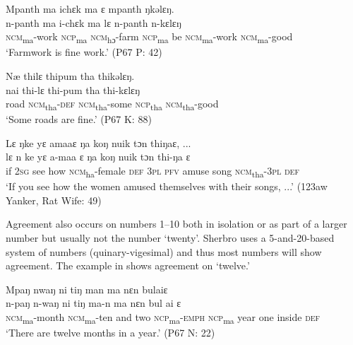 \ex \label{ex:136b} Mpanth ma ichɛk ma ɛ mpanth ŋkəlɛŋ.\\
    \gll n-panth      ma    i-chɛk      ma    lɛ    n-panth      n-kɛlɛŋ\\
    \textsc{ncm}\textsubscript{ma}\textsc{{}-}work  \textsc{ncp}\textsubscript{ma}    \textsc{ncm}\textsubscript{hɔ}\textsc{{}-}farm    \textsc{ncp}\textsubscript{ma}    be    \textsc{ncm}\textsubscript{ma}\textsc{{}-}work  \textsc{ncm}\textsubscript{ma}\textsc{{}-}good\\
    \glt ‘Farmwork is fine work.' (P67 P: 42)

\ex \label{ex:136c} Næ thilɛ thipum tha thikəlɛŋ.\\
    \gll nai    thi-lɛ        thi-pum      tha     thi-kɛlɛŋ\\
    road    \textsc{ncm}\textsubscript{tha}{}-\textsc{def}    \textsc{ncm}\textsubscript{tha}{}-some  \textsc{ncp}\textsubscript{tha}    \textsc{ncm}\textsubscript{tha}{}-good\\
    \glt ‘Some roads are fine.' (P67 K: 88)

\ex  \label{ex:136d} Lɛ ŋke yɛ amaaɛ ŋa koŋ nuik tɔn thiŋaɛ, ...\\
    \gll lɛ  n    ke    yɛ    a-maa      ɛ    ŋa    koŋ  nuik    tɔn  thi-ŋa      ɛ\\
    if  \textsc{2sg}  see  how  \textsc{ncm}\textsubscript{ha}{}-female  \textsc{def}  \textsc{3pl}  \textsc{pfv}  amuse  song  \textsc{ncm}\textsubscript{tha}{}-\textsc{3pl}  \textsc{def}\\
    \glt ‘If you see how the women amused themselves with their songs, ...' (123aw Yanker, Rat Wife: 49)
\z
\z

Agreement also occurs on numbers 1--10 both in isolation or as part of a larger number but usually not the number ‘twenty'. Sherbro uses a 5-and-20-based system of numbers (quinary-vigesimal) and thus most numbers will show agreement. The example in   shows agreement on ‘twelve.'

\ea%
    \label{ex:137}
    Mpaŋ nwaŋ ni tiŋ man ma nɛn bulaiɛ\\
    \gll n-paŋ        n-waŋ    ni    tiŋ    ma-n       ma    nɛn  bul  ai      ɛ\\
    \textsc{ncm}\textsubscript{ma}{}-month  \textsc{ncm}\textsubscript{ma}{}-ten  and  two  \textsc{ncp}\textsubscript{ma}\textsc{{}-emph} \textsc{ncp}\textsubscript{ma}  year  one  inside    \textsc{def}\\
    \glt ‘There are twelve months in a year.' (P67 N: 22)
\z

